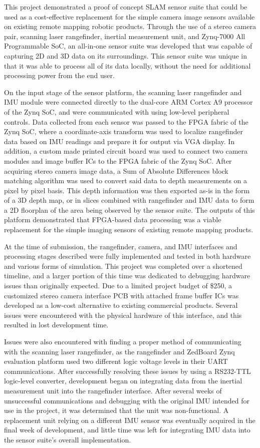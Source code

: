 This project demonstrated a proof of concept SLAM sensor suite that could be used as a cost-effective replacement for the simple camera image sensors available on existing remote mapping robotic products. Through the use of a stereo camera pair, scanning laser rangefinder, inertial measurement unit, and Zynq-7000 All Programmable SoC, an all-in-one sensor suite was developed that was capable of capturing 2D and 3D data on its surroundings. This sensor suite was unique in that it was able to process all of its data locally, without the need for additional processing power from the end user.
\par
On the input stage of the sensor platform, the scanning laser rangefinder and IMU module were connected directly to the dual-core ARM Cortex A9 processor of the Zynq SoC, and were communicated with using low-level peripheral controls. Data collected from each sensor was passed to the FPGA fabric of the Zynq SoC, where a coordinate-axis transform was used to localize rangefinder data based on IMU readings and prepare it for output via VGA display. In addition, a custom made printed circuit board was used to connect two camera modules and image buffer ICs to the FPGA fabric of the Zynq SoC. After acquiring stereo camera image data, a Sum of Absolute Differences block matching algorithm was used to convert said data to depth measurements on a pixel by pixel basis. This depth information was then exported as-is in the form of a 3D depth map, or in slices combined with rangefinder and IMU data to form a 2D floorplan of the area being observed by the sensor suite. The outputs of this platform demonstrated that FPGA-based data processing was a viable replacement for the simple imaging sensors of existing remote mapping products. 
\par
At the time of submission, the rangefinder, camera, and IMU interfaces and processing stages described were fully implemented and tested in both hardware and various forms of simulation. This project was completed over a shortened timeline, and a larger portion of this time was dedicated to debugging hardware issues than originally expected. Due to a limited project budget of \$250, a customized stereo camera interface PCB with attached frame buffer ICs was developed as a low-cost alternative to existing commercial products. Several issues were encountered with the physical hardware of this interface, and this resulted in lost development time. 
\par
Issues were also encountered with finding a proper method of communicating with the scanning laser rangefinder, as the rangefinder and ZedBoard Zynq evaluation platform used two different logic voltage levels in their UART communications.  After successfully resolving these issues by using a RS232-TTL logic-level converter, development began on integrating data from the inertial measurement unit into the rangefinder interface. After several weeks of unsuccessful communications and debugging with the original IMU intended for use in the project, it was determined that the unit was non-functional. A replacement unit relying on a different IMU sensor was eventually acquired in the final week of development, and little time was left for integrating IMU data into the sensor suite's overall implementation.
